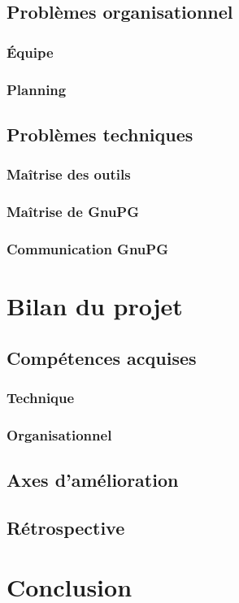 \documentclass{../res/univ-projet}
\begin{document}
  \subsection{Problèmes organisationnel}
    \subsubsection{Équipe}
    \subsubsection{Planning}
    
  \subsection{Problèmes techniques}
    \subsubsection{Maîtrise des outils}
    \subsubsection{Maîtrise de GnuPG}
    \subsubsection{Communication GnuPG}
  

\section{Bilan du projet}
  \subsection{Compétences acquises}
    \subsubsection{Technique}
    \subsubsection{Organisationnel}
  \subsection{Axes d'amélioration}
  \subsection{Rétrospective}

\section{Conclusion}
\end{document}
